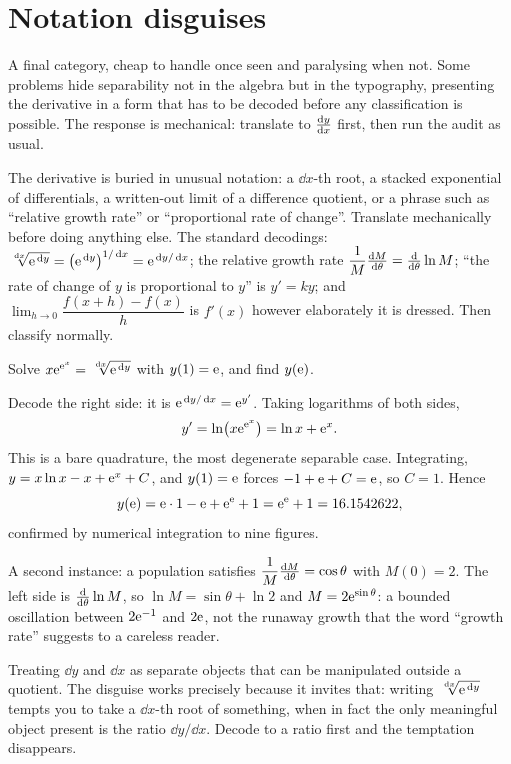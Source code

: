 \section{Notation disguises}

A final category, cheap to handle once seen and paralysing when not. Some problems hide separability not in the algebra but in the typography, presenting the derivative in a form that has to be decoded before any classification is possible. The response is mechanical: translate to $\frac{\mathrm{d}y}{\mathrm{d}x}$ first, then run the audit as usual.

\cue The derivative is buried in unusual notation: a $\dd x$-th root, a stacked exponential of differentials, a written-out limit of a difference quotient, or a phrase such as ``relative growth rate'' or ``proportional rate of change''.
\method Translate mechanically before doing anything else. The standard decodings: $\sqrt[\,\mathrm{d} x]{\mathrm{e}^{\,\mathrm{d} y}}=\bigl(\mathrm{e}^{\,\mathrm{d} y}\bigr)^{1/\,\mathrm{d} x}=\mathrm{e}^{\,\mathrm{d} y/\,\mathrm{d} x}$; the relative growth rate $\dfrac{1}{M}\frac{\mathrm{d}M}{\mathrm{d}\theta}=\frac{\mathrm{d}}{\mathrm{d}\theta}\ln M$; ``the rate of change of $y$ is proportional to $y$'' is $y'=ky$; and $\lim_{h\to0}\dfrac{f(x+h)-f(x)}{h}$ is $f'(x)$ however elaborately it is dressed. Then classify normally.

\begin{worked}
Solve $x\mathrm{e}^{\mathrm{e}^{x}}=\sqrt[\,\mathrm{d} x]{\mathrm{e}^{\,\mathrm{d} y}}$ with $y(1)=\mathrm{e}$, and find $y(\mathrm{e})$.

Decode the right side: it is $\mathrm{e}^{\,\mathrm{d} y/\,\mathrm{d} x}=\mathrm{e}^{y'}$. Taking logarithms of both sides,
\[y'=\ln\bigl(x\mathrm{e}^{\mathrm{e}^{x}}\bigr)=\ln x+\mathrm{e}^{x}.\]
This is a bare quadrature, the most degenerate separable case. Integrating, $y=x\ln x-x+\mathrm{e}^{x}+C$, and $y(1)=\mathrm{e}$ forces $-1+\mathrm{e}+C=\mathrm{e}$, so $C=1$. Hence
\[y(\mathrm{e})=\mathrm{e}\cdot1-\mathrm{e}+\mathrm{e}^{\mathrm{e}}+1=\mathrm{e}^{\mathrm{e}}+1=16.1542622,\]
confirmed by numerical integration to nine figures.

A second instance: a population satisfies $\dfrac{1}{M}\frac{\mathrm{d}M}{\mathrm{d}\theta}=\cos\theta$ with $M(0)=2$. The left side is $\frac{\mathrm{d}}{\mathrm{d}\theta}\ln M$, so $\ln M=\sin\theta+\ln2$ and $M=2\mathrm{e}^{\sin\theta}$: a bounded oscillation between $2\mathrm{e}^{-1}$ and $2\mathrm{e}$, not the runaway growth that the word ``growth rate'' suggests to a careless reader.
\end{worked}

\begin{trap}
Treating $\dd y$ and $\dd x$ as separate objects that can be manipulated outside a quotient. The disguise works precisely because it invites that: writing $\sqrt[\,\mathrm{d} x]{\mathrm{e}^{\,\mathrm{d} y}}$ tempts you to take a $\dd x$-th root of something, when in fact the only meaningful object present is the ratio $\dd y/\dd x$. Decode to a ratio first and the temptation disappears.
\end{trap}

